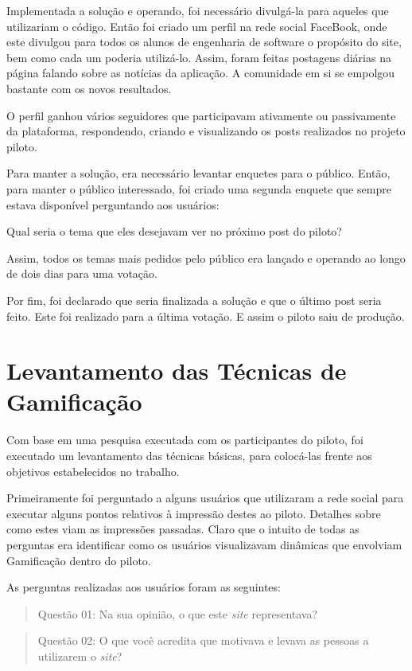 Implementada a solução e operando, foi necessário divulgá-la para aqueles que utilizariam o código.
Então foi criado um perfil na rede social FaceBook, onde este divulgou para todos os alunos de engenharia
de software o propósito do site, bem como cada um poderia utilizá-lo. Assim, foram feitas postagens diárias
na página falando sobre as notícias da aplicação. A comunidade em si se empolgou bastante com os novos resultados.

O perfil ganhou vários seguidores que participavam ativamente ou passivamente da plataforma, respondendo, criando e
visualizando os posts realizados no projeto piloto.

Para manter a solução, era necessário levantar enquetes para o público. Então, para manter o público interessado,
foi criado uma segunda enquete que sempre estava disponível perguntando aos usuários:

Qual seria o tema que eles desejavam ver no próximo post do piloto?

Assim, todos os temas mais pedidos pelo público era lançado e operando ao longo de dois dias para uma votação.

Por fim, foi declarado que seria finalizada a solução e que o último post seria feito. Este foi realizado para a
última votação. E assim o piloto saiu de produção.

\section{Levantamento das Técnicas de Gamificação}
\label{sec:implementacao_levantamento}
Com base em uma pesquisa executada com os participantes do piloto, foi executado um levantamento das
técnicas básicas, para colocá-las frente aos objetivos estabelecidos no trabalho.

Primeiramente foi perguntado a alguns usuários que utilizaram a rede social para executar alguns
pontos relativos à impressão destes ao piloto. Detalhes sobre como estes viam as impressões passadas.
Claro que o intuito de todas as perguntas era identificar como os usuários visualizavam dinâmicas
que envolviam Gamificação dentro do piloto.

As perguntas realizadas aos usuários foram as seguintes:

\begin{quotation}
    Questão 01: Na sua opinião, o que este \textit{site} representava?
\end{quotation}

\begin{quotation}
    Questão 02: O que você acredita que motivava e levava as pessoas a utilizarem o \textit{site}?
\end{quotation}

